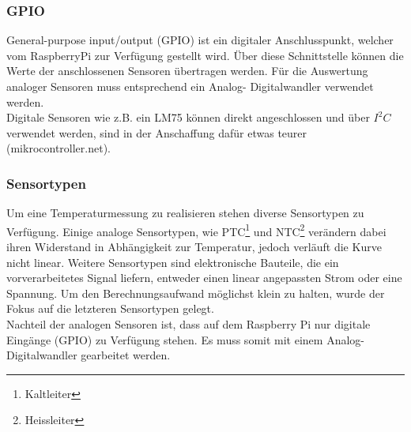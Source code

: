 \subsubsection{GPIO}
General-purpose input/output (GPIO) ist ein digitaler Anschlusspunkt, welcher vom RaspberryPi zur Verfügung gestellt wird. Über diese Schnittstelle können die Werte der anschlossenen Sensoren übertragen werden. Für die Auswertung analoger Sensoren muss entsprechend ein Analog- Digitalwandler verwendet werden.\\
Digitale Sensoren wie z.B. ein LM75 können direkt angeschlossen und über $I^2C$ verwendet werden, sind in der Anschaffung dafür etwas teurer (mikrocontroller.net).

\subsubsection{Sensortypen}
Um eine Temperaturmessung zu realisieren stehen diverse Sensortypen zu Verfügung. Einige analoge Sensortypen, wie PTC\footnote{Kaltleiter} und NTC\footnote{Heissleiter} verändern dabei ihren Widerstand in Abhängigkeit zur Temperatur, jedoch verläuft die Kurve nicht linear. Weitere Sensortypen sind elektronische Bauteile, die ein vorverarbeitetes Signal liefern, entweder einen linear angepassten Strom oder eine Spannung. Um den Berechnungsaufwand möglichst klein zu halten, wurde der Fokus auf die letzteren Sensortypen gelegt.\\
Nachteil der analogen Sensoren ist, dass auf dem Raspberry Pi nur digitale Eingänge (GPIO) zu Verfügung stehen. Es muss somit  mit einem Analog- Digitalwandler gearbeitet werden.


